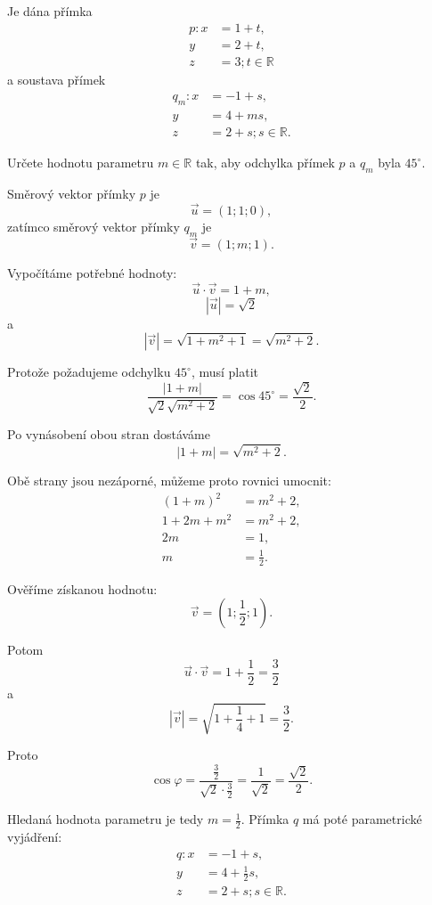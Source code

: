 \begin{example}
    \label{exa:Angle_lines_parameter_space}

    Je dána přímka
    \[
        \begin{aligned}
            p: x&=1+t,\\
            y&=2+t,\\
            z&=3; t\in\mathbb{R}
        \end{aligned}
    \]
    a soustava přímek
    \[
        \begin{aligned}
            q_m: x&=-1+s,\\
            y&=4+ms,\\
            z&=2+s; s\in\mathbb{R}.
        \end{aligned}
    \]

    Určete hodnotu parametru $m\in\mathbb{R}$ tak, aby odchylka
    přímek $p$ a $q_m$ byla $45^\circ$.

    Směrový vektor přímky $p$ je
    \[
        \vec{u}=(1;1;0),
    \]
    zatímco směrový vektor přímky $q_m$ je
    \[
        \vec{v}=(1;m;1).
    \]

    Vypočítáme potřebné hodnoty:
    \[
        \vec{u}\cdot\vec{v}
        =
        1+m,
    \]
    \[
        |\vec{u}|=\sqrt2
    \]
    a
    \[
        |\vec{v}|
        =
        \sqrt{1+m^2+1}
        =
        \sqrt{m^2+2}.
    \]

    Protože požadujeme odchylku $45^\circ$, musí platit
    \[
        \frac{|1+m|}
             {\sqrt2\sqrt{m^2+2}}
        =
        \cos45^\circ
        =
        \frac{\sqrt2}{2}.
    \]

    Po vynásobení obou stran dostáváme
    \[
        |1+m|
        =
        \sqrt{m^2+2}.
    \]

    Obě strany jsou nezáporné, můžeme proto rovnici umocnit:
    \begin{align*}
        (1+m)^2&=m^2+2,\\
        1+2m+m^2&=m^2+2,\\
        2m&=1,\\
        m&=\frac12.
    \end{align*}

    Ověříme získanou hodnotu:
    \[
        \vec{v}
        =
        \left(1;\frac12;1\right).
    \]

    Potom
    \[
        \vec{u}\cdot\vec{v}
        =
        1+\frac12
        =
        \frac32
    \]
    a
    \[
        |\vec{v}|
        =
        \sqrt{1+\frac14+1}
        =
        \frac32.
    \]

    Proto
    \[
        \cos\varphi
        =
        \frac{\frac32}
             {\sqrt2\cdot\frac32}
        =
        \frac{1}{\sqrt2}
        =
        \frac{\sqrt2}{2}.
    \]

    Hledaná hodnota parametru je tedy $m=\frac{1}{2}$.
    Přímka $q$ má poté parametrické vyjádření:
    \begin{align*}
        q:  x&=-1+s,\\
            y&=4+\frac12s,\\
            z&=2+s; s\in\mathbb{R}.
    \end{align*}

\end{example}

